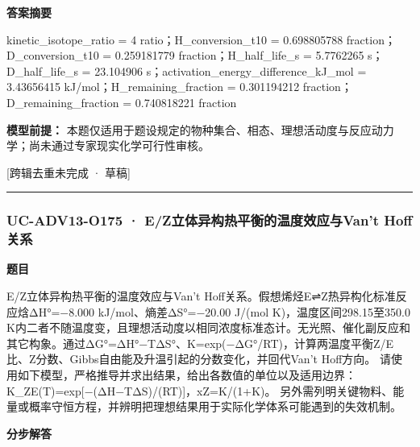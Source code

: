 \documentclass[UTF8,11pt,a4paper]{ctexart}
\begin{document}
\noindent\textbf{答案摘要}\par
kinetic\_isotope\_ratio = 4 ratio；H\_conversion\_t10 = 0.698805788 fraction；D\_conversion\_t10 = 0.259181779 fraction；H\_half\_life\_s = 5.7762265 s；D\_half\_life\_s = 23.104906 s；activation\_energy\_difference\_kJ\_mol = 3.43656415 kJ/mol；H\_remaining\_fraction = 0.301194212 fraction；D\_remaining\_fraction = 0.740818221 fraction\par
\noindent\textbf{模型前提：}
本题仅适用于题设规定的物种集合、相态、理想活动度与反应动力学；尚未通过专家现实化学可行性审核。\par
\noindent\textcolor{red!65!black}{[跨辑去重未完成 · 草稿]} \par
\medskip\hrule\medskip
{}
\subsubsection*{UC-ADV13-O175 · E/Z立体异构热平衡的温度效应与Van’t Hoff关系}
\noindent\textbf{题目}\par
E/Z立体异构热平衡的温度效应与Van’t Hoff关系。假想烯烃E⇌Z热异构化标准反应焓ΔH°=−8.000 kJ/mol、熵差ΔS°=−20.00 J/(mol K)，温度区间298.15至350.0 K内二者不随温度变，且理想活动度以相同浓度标准态计。无光照、催化副反应和其它构象。通过ΔG°=ΔH°−TΔS°、K=exp(−ΔG°/RT)，计算两温度平衡Z/E比、Z分数、Gibbs自由能及升温引起的分数变化，并回代Van’t Hoff方向。 请使用如下模型，严格推导并求出结果，给出各数值的单位以及适用边界：K\_ZE(T)=exp[−(ΔH−TΔS)/(RT)]，xZ=K/(1+K)。 另外需列明关键物料、能量或概率守恒方程，并辨明把理想结果用于实际化学体系可能遇到的失效机制。\par
\medskip\noindent\textbf{分步解答}
\end{document}
